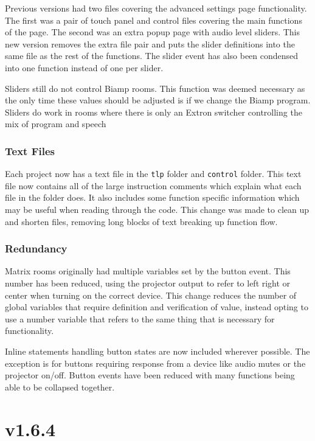 \documentclass{article}
\begin{document}
Previous versions had two files covering the advanced settings page functionality. The first was a pair of touch panel 
and control files covering the main functions of the page. The second was an extra popup page with audio level sliders.
This new version removes the extra file pair and puts the slider definitions into the same file as the rest of the
functions. The slider event has also been condensed into one function instead of one per slider. 

Sliders still do not control Biamp rooms. This function was deemed necessary as the only time these values should be adjusted 
is if we change the Biamp program. Sliders do work in rooms where there is only an Extron switcher controlling the mix of 
program and speech

\subsubsection*{Text Files}

Each project now has a text file in the \lstinline|tlp| folder and \lstinline|control| folder. This text file now contains 
all of the large instruction comments which explain what each file in the folder does. It also includes some function 
specific information which may be useful when reading through the code. This change was made to clean up and shorten files,
removing long blocks of text breaking up function flow. 

\subsubsection*{Redundancy}

Matrix rooms originally had multiple variables set by the button event. This number has been reduced, using the projector 
output to refer to left right or center when turning on the correct device. This change reduces the number of global variables 
that require definition and verification of value, instead opting to use a number variable that refers to the same thing that 
is necessary for functionality.

Inline statements handling button states are now included wherever possible. The exception is for buttons requiring response 
from a device like audio mutes or the projector on/off. Button events have been reduced with many functions being able to
be collapsed together. 

\section*{v1.6.4}
\end{document}
